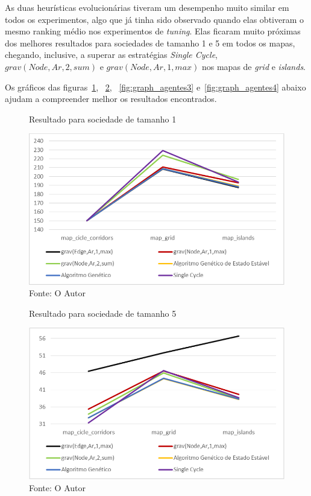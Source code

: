 As duas heurísticas evolucionárias tiveram um desempenho muito similar em 
todos os experimentos, algo que já tinha sido observado quando elas obtiveram 
o mesmo ranking médio nos experimentos de \textit{tuning}. Elas ficaram muito 
próximas dos melhores resultados para sociedades de tamanho 1 e 5 em todos os 
mapas, chegando, inclusive, a superar as estratégias \textit{Single Cycle}, 
$grav(Node,Ar,2,sum)$ e $grav(Node,Ar,1,max)$ nos mapas de \textit{grid} e 
\textit{islands}.

Os gráficos das figuras~\ref{fig:graph_agentes1}, ~\ref{fig:graph_agentes2}, 
~\ref{fig:graph_agentes3} e~\ref{fig:graph_agentes4} abaixo ajudam a 
compreender melhor os resultados encontrados.

\begin{figure}[b]
	\caption[Resultado para sociedade de tamanho 1]{Resultado para sociedade 
		de tamanho 1}
	\centering
	\includegraphics[width=\columnwidth]{images/graph_agent1.png}
	\caption*{Fonte: O Autor}
	\label{fig:graph_agentes1}
\end{figure}

\begin{figure}
	\caption[Resultado para sociedade de tamanho 5]{Resultado para sociedade 
		de tamanho 5}
	\centering
	\includegraphics[width=\columnwidth]{images/graph_agent2.png}
	\caption*{Fonte: O Autor}
	\label{fig:graph_agentes2}
\end{figure}

